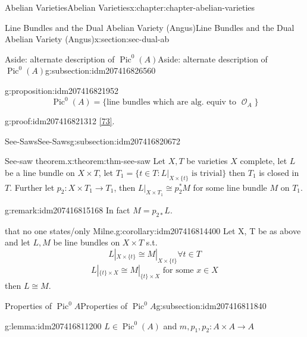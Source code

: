 \documentclass[oneside,10pt,]{book}
\numberwithin{equation}{section}
\newcommand{\sheaf}[1]{\operatorname{\mathcal{#1}}}
\DeclareMathOperator{\Pic}{Pic}
\begin{document}
\begin{chapterptx}{Abelian Varieties}{}{Abelian Varieties}{}{}{x:chapter:chapter-abelian-varieties}
\begin{sectionptx}{Line Bundles and the Dual Abelian Variety (Angus)}{}{Line Bundles and the Dual Abelian Variety (Angus)}{}{}{x:section:sec-dual-ab}
\begin{subsectionptx}{Aside: alternate description of \(\Pic^0(A)\)}{}{Aside: alternate description of \(\Pic^0(A)\)}{}{}{g:subsection:idm207416826560}
\begin{proposition}{}{}{g:proposition:idm207416821952}
%
\begin{equation*}
\Pic^0(A) = \{\text{line bundles which are alg. equiv to } \sheaf O_A\}
\end{equation*}
%
\end{proposition}
\begin{proofptx}{}{g:proof:idm207416821312}
\hyperlink{x:biblio:bib-polishchuck}{[73]}.%
\end{proofptx}
\end{subsectionptx}
%
%
\typeout{************************************************}
\typeout{************************************************}
%
\begin{subsectionptx}{See-Saws}{}{See-Saws}{}{}{g:subsection:idm207416820672}
\begin{theorem}{See-saw theorem.}{}{x:theorem:thm-see-saw}%
Let \(X,T\) be varieties      \(X\) complete, let \(L\) be a line bundle  on \(X\times T\), let \(T_1 = \{t\in T : L|_{X\times\{t\}} \text{ is trivial}\}\) then \(T_1\) is closed in \(T\). Further let \(p_2\colon X\times T_1 \to T_1\), then \(L|_{X\times T_1} \cong p^*_2 M\) for some line bundle \(M\) on \(T_1\).%
\end{theorem}
\begin{remark}{}{g:remark:idm207416815168}%
In fact \(M = p_{2*}L\).%
\end{remark}
\begin{corollary}{that no one states\slash{}only Milne.}{}{g:corollary:idm207416814400}%
Let X, T be as above and let \(L, M\) be line bundles on \(X\times T\) s.t.%
\begin{equation*}
L|_{X\times \{t\}} \cong M|_{X\times \{t\}} \forall t\in T
\end{equation*}
%
\begin{equation*}
L|_{\{t\}\times X} \cong M|_{\{t\}\times X} \text{ for some } x\in X
\end{equation*}
then \(L\cong M\).%
\end{corollary}
\end{subsectionptx}
%
%
\typeout{************************************************}
\typeout{Subsection 1.7.4 Properties of \(\Pic^0 A\)}
\typeout{************************************************}
%
\begin{subsectionptx}{Properties of \(\Pic^0 A\)}{}{Properties of \(\Pic^0 A\)}{}{}{g:subsection:idm207416811840}
\begin{lemma}{}{}{g:lemma:idm207416811200}%
\(L\in \Pic^0(A)\) and \(m,p_1,p_2\colon A\times A \to A\)%
\begin{enumerate}

\end{enumerate}
\end{lemma}
\end{subsectionptx}
\end{sectionptx}
\end{chapterptx}
\end{document}
